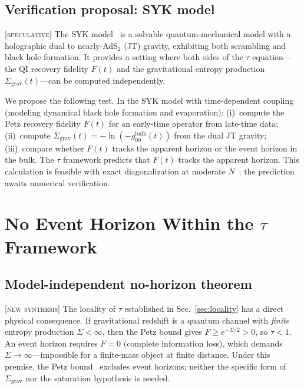\documentclass[prl,twocolumn,superscriptaddress,longbibliography,floatfix]{revtex4-2}
\newcommand{\tauasym}{\tau}
\newcommand{\Sgrav}{\Sigma_{\mathrm{grav}}}
\begin{document}
\subsection{Verification proposal: SYK model}
\label{sec:SYK}

[\textsc{speculative}]
The SYK model~\cite{SachdevYe1993,MaldacenaStanford2016}
is a solvable quantum-mechanical model with a holographic
dual to nearly-AdS$_{2}$ (JT) gravity, exhibiting both
scrambling and black hole formation.
It provides a setting where both sides of the $\tauasym$
equation---the QI recovery fidelity $F(t)$ and the
gravitational entropy production $\Sgrav(t)$---can be
computed independently.

We propose the following test.
In the SYK model with time-dependent coupling (modeling
dynamical black hole formation and evaporation):
(i)~compute the Petz recovery fidelity $F(t)$
for an early-time operator from late-time data;
(ii)~compute $\Sgrav(t) = -\ln(-g_{00}^{\text{bulk}}(t))$
from the dual JT gravity;
(iii)~compare whether $F(t)$ tracks the apparent
horizon or the event horizon in the bulk.
The $\tauasym$ framework predicts that $F(t)$ tracks the
apparent horizon.
This calculation is feasible with exact diagonalization
at moderate $N$~\cite{MaldacenaStanford2016}; the
prediction awaits numerical verification.

\section{No Event Horizon Within the $\tauasym$ Framework}
\label{sec:nohorizon}

\subsection{Model-independent no-horizon theorem}

[\textsc{new synthesis}]
The locality of $\tauasym$ established in
Sec.~\ref{sec:locality} has a direct physical consequence.
If gravitational redshift is a quantum channel with
\emph{finite} entropy production $\Sigma < \infty$, then
the Petz bound gives
$F \geq e^{-\Sigma/2} > 0$, so $\tauasym < 1$.
An event horizon requires $F = 0$ (complete information loss),
which demands $\Sigma \to \infty$---impossible for a
finite-mass object at finite distance.
Under this premise, the Petz bound~\cite{JRSWW2018} excludes
event horizons; neither the specific
form of $\Sgrav$ nor the saturation hypothesis is needed.
\end{document}
